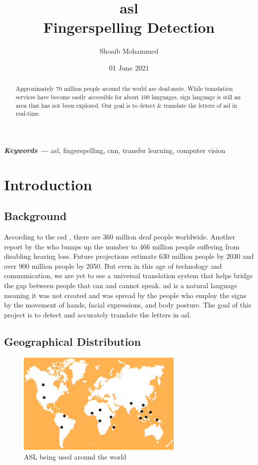 \documentclass[twocolumn]{article}
\title{\gls{asl}\\
	Fingerspelling Detection}
\author{Shoaib Mohammed}
\date{01 June 2021}
\providecommand{\keywords}[1]
{
  \small
  \noindent \textbf{\textit{Keywords ---}} #1
}
\begin{document}
\begin{titlingpage}
\maketitle
\end{titlingpage}

\begin{abstract}
Approximately 70 million people around the world are deaf-mute. While 
translation services have become easily accessible for about 100 
languages, sign language is still an area that has not been explored. 
Our goal is to detect \& translate the letters of \gls{asl} in real-time.
\end{abstract}

\keywords{\gls{asl}, fingerspelling, \gls{cnn}, transfer learning, 
computer vision}


\section{Introduction}

\subsection{Background}
According to the \gls{csd} \cite{csd}, there are 360 million deaf people 
worldwide. Another report by the \gls{who} \cite{who} bumps up the number to 
466 million people suffering from disabling hearing loss. Future projections 
estimate 630 million people by 2030 and over 900 million people by 2050. 
But even in this age of technology and communication, we are yet to see a 
universal translation system that helps bridge the gap between people that 
can and cannot speak. \gls{asl} is a natural language meaning it was not 
created and was spread by the people who employ the signs by the movement of 
hands, facial expressions, and body posture. The goal of this project is to 
detect and accurately translate the letters in \gls{asl}.

\subsection{Geographical Distribution}

\begin{figure}[h]
  \centering
  \includegraphics[width=8cm]{./figures/asl being used around the world}
  \caption{ASL being used around the world}
  \end{figure}
\end{document}
